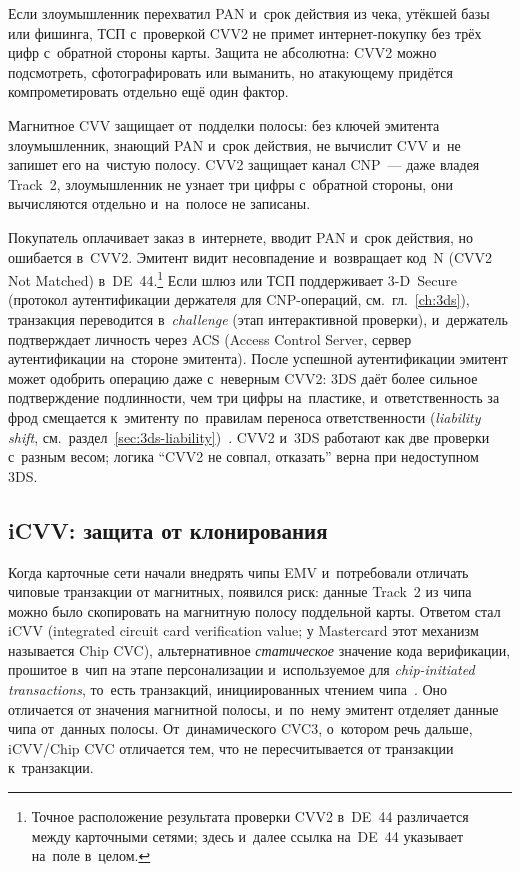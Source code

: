 Если злоумышленник перехватил PAN и~срок действия из чека, утёкшей базы или
фишинга, ТСП с~проверкой CVV2 не примет интернет-покупку без трёх цифр
с~обратной стороны карты. Защита не абсолютна: CVV2 можно подсмотреть,
сфотографировать или выманить, но атакующему придётся компрометировать
отдельно ещё один фактор.

Магнитное CVV защищает от~подделки полосы: без ключей эмитента злоумышленник,
знающий PAN и~срок действия, не вычислит CVV и~не запишет его на~чистую полосу.
CVV2 защищает канал CNP~--- даже владея Track~2, злоумышленник не узнает три
цифры с~обратной стороны, они вычисляются отдельно и~на~полосе не записаны.

Покупатель оплачивает заказ в~интернете, вводит PAN и~срок действия, но
ошибается в~CVV2. Эмитент видит несовпадение и~возвращает код~N (CVV2 Not
Matched) в~DE~44.\footnote{Точное расположение результата проверки CVV2 в~DE~44
различается между карточными сетями; здесь и~далее ссылка на~DE~44 указывает на~поле в~целом.} Если шлюз или
ТСП поддерживает 3-D~Secure (протокол аутентификации держателя для
CNP-операций, см.~гл.~\ref{ch:3ds}), транзакция переводится в~\textit{challenge}
(этап интерактивной проверки), и~держатель подтверждает личность через ACS
(Access Control Server, сервер аутентификации на~стороне эмитента). После
успешной аутентификации эмитент может одобрить операцию даже с~неверным CVV2:
3DS даёт более сильное подтверждение подлинности, чем три цифры на~пластике,
и~ответственность за фрод смещается к~эмитенту по~правилам переноса
ответственности (\textit{liability shift},
см.~раздел~\ref{sec:3ds-liability})~\cite{visa-core-rules}. CVV2 и~3DS работают
как две проверки с~разным весом; логика \enquote{CVV2 не совпал, отказать}
верна при недоступном 3DS.

\subsection*{iCVV: защита от клонирования}

Когда карточные сети начали внедрять чипы EMV и~потребовали отличать чиповые
транзакции от магнитных, появился риск: данные Track~2 из чипа можно было
скопировать на магнитную полосу поддельной карты. Ответом стал iCVV
(integrated circuit card verification value; у Mastercard этот механизм
называется Chip CVC), альтернативное \emph{статическое} значение кода
верификации, прошитое в~чип на этапе персонализации и~используемое для
\textit{chip-initiated transactions}, то~есть транзакций, инициированных чтением
чипа~\cite{visa-vsdc-guide,mc-security-rules-2016}. Оно отличается от значения
магнитной полосы, и~по~нему эмитент отделяет данные чипа от~данных полосы.
От~динамического CVC3, о~котором речь дальше, iCVV/Chip CVC отличается тем, что
не пересчитывается от транзакции к~транзакции.

